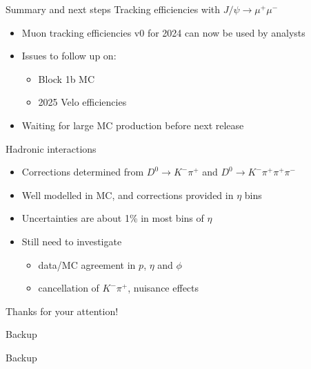 \documentclass[xcolor={dvipsnames}]{beamer}
\def\pip    {{\ensuremath{\pi^+}}\xspace}
\def\pim    {{\ensuremath{\pi^-}}\xspace}
\def\Km     {{\ensuremath{K^-}}\xspace}
\def\Dz     {{\ensuremath{D^0}}\xspace}
\def\DKpi   {\ensuremath{\Dz \rightarrow \Km \pip}\xspace}
\def\DKpipipi   {\ensuremath{\Dz \rightarrow \Km \pip \pip \pim}\xspace}
\begin{document}
\begin{frame}{Summary and next steps}
  \vspace{0.0cm}
  {\large Tracking efficiencies with $J/\psi\to\mu^+\mu^-$}
  \begin{itemize}
    \item{Muon tracking efficiencies v0 for 2024 can now be used by analysts}
    \item{Issues to follow up on:}
    \begin{itemize}
      \item[-]{Block 1b MC}
      \item[-]{2025 Velo efficiencies}
    \end{itemize}
    \item{Waiting for large MC production before next release}
  \end{itemize}
  \vspace{0.1cm}
  {\large Hadronic interactions}
  \begin{itemize}
    \item{Corrections determined from \DKpi and \DKpipipi}
    \item{Well modelled in MC, and corrections provided in $\eta$ bins}
    \item{Uncertainties are about 1\% in most bins of $\eta$}
    \item{Still need to investigate}
    \begin{itemize}
      \item[-]{data/MC agreement in $p$, $\eta$ and $\phi$}
      \item[-]{cancellation of $K^-\pi^+$, nuisance effects}
    \end{itemize}
  \end{itemize}
  \vspace{0.0cm}
  \begin{center}
    \Huge Thanks for your attention!
  \end{center}
\end{frame}

\begin{frame}{Backup}
  \vspace{0.0cm}
  \begin{center}
    {\Large Backup}
  \end{center}
\end{frame}
\end{document}

